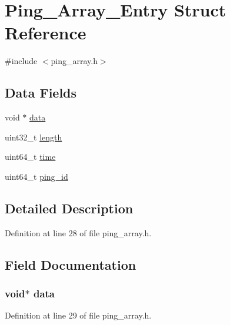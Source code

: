 \hypertarget{struct_ping___array___entry}{\section{Ping\+\_\+\+Array\+\_\+\+Entry Struct Reference}
\label{struct_ping___array___entry}
}


{\ttfamily \#include $<$ping\+\_\+array.\+h$>$}

\subsection*{Data Fields}
\begin{DoxyCompactItemize}
\item 
void $\ast$ \hyperlink{struct_ping___array___entry_a735984d41155bc1032e09bece8f8d66d}{data}
\item 
uint32\+\_\+t \hyperlink{struct_ping___array___entry_aebb70c2aab3407a9f05334c47131a43b}{length}
\item 
uint64\+\_\+t \hyperlink{struct_ping___array___entry_a5d34a8f2dfe25421b2b473a5fd37b0ed}{time}
\item 
uint64\+\_\+t \hyperlink{struct_ping___array___entry_acec02fbdff648ca71a6d8e5a0d63d634}{ping\+\_\+id}
\end{DoxyCompactItemize}


\subsection{Detailed Description}


Definition at line 28 of file ping\+\_\+array.\+h.



\subsection{Field Documentation}
\hypertarget{struct_ping___array___entry_a735984d41155bc1032e09bece8f8d66d}{
\subsubsection[{data}]{\setlength{\rightskip}{0pt plus 5cm}void$\ast$ data}}\label{struct_ping___array___entry_a735984d41155bc1032e09bece8f8d66d}


Definition at line 29 of file ping\+\_\+array.\+h.



